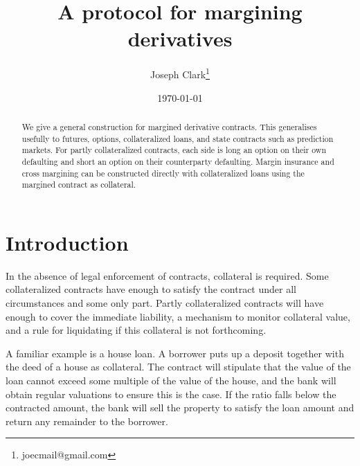 \documentclass[12pt]{article}
\begin{document}
\begin{titlepage}
\title{A protocol for margining derivatives}
\author{Joseph Clark\thanks{joecmail@gmail.com}  }
\date{\today}
\maketitle
\begin{abstract}
\noindent We give a general construction for margined derivative contracts. This generalises usefully to futures, options, collateralized loans, and state contracts such as prediction markets. For partly collateralized contracts, each side is long an option on their own defaulting and short an option on their counterparty defaulting. Margin insurance and cross margining can be constructed directly with collateralized loans using the margined contract as collateral. 



\bigskip
\end{abstract}
\setcounter{page}{0}
\thispagestyle{empty}
\end{titlepage}
\pagebreak \newpage



\doublespacing


\section{Introduction} \label{sec:introduction}

In the absence of legal enforcement of contracts, collateral is required. Some collateralized contracts have enough to satisfy the contract under all circumstances and some only part. Partly collateralized contracts will have enough to cover the immediate liability, a mechanism to monitor collateral value, and a rule for liquidating if this collateral is not forthcoming.

A familiar example is a house loan. A borrower puts up a deposit together with the deed of a house as collateral. The contract will stipulate that the value of the loan cannot exceed some multiple of the value of the house, and the bank will obtain regular valuations to ensure this is the case. If the ratio falls below the contracted amount, the bank will sell the property to satisfy the loan amount and return any remainder to the borrower.
\end{document}
